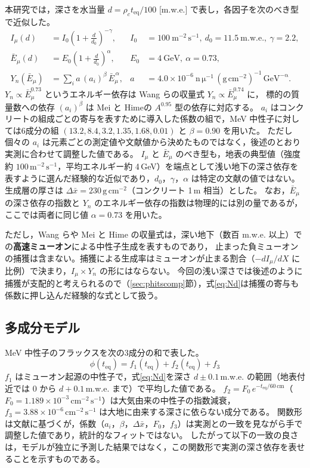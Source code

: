 \documentclass[a4paper,11pt]{ltjsarticle}
\newcommand{\teq}{t_{\mathrm{eq}}}
\newcommand{\flux}{\mathrm{cm^{-2}\,s^{-1}}}
\newcommand{\gcm}{\mathrm{g\,cm^{-2}}}
\begin{document}
本研究では，深さを水当量 $d=\rho_c\teq/100$ [m.w.e.] で表し，各因子を次のべき型で近似した。
\begin{align}
  I_\mu(d) &= I_0\left(1+\frac{d}{d_0}\right)^{-\gamma},
  & I_0 &= 100\ \mathrm{m^{-2}\,s^{-1}},\ d_0=11.5\ \mathrm{m.w.e.},\ \gamma=2.2, \\
  \bar{E}_\mu(d) &= E_0\left(1+\frac{d}{d_0}\right)^{\alpha},
  & E_0 &= 4\ \mathrm{GeV},\ \alpha=0.73, \\
  Y_n(\bar{E}_\mu) &= \sum_i a\,(a_i)^{\beta}\,\bar{E}_\mu^{\,\alpha},
  & a &= 4.0\times10^{-6}\ \mathrm{n\,\mu^{-1}\,(g\,cm^{-2})^{-1}\,GeV^{-\alpha}}.
\end{align}
$Y_n\propto\bar{E}_\mu^{0.73}$ というエネルギー依存は Wang ら\cite{Wang2001}の収量式 $Y_n\propto\bar{E}_\mu^{0.74}$ に，
標的の質量数への依存 $(a_i)^{\beta}$ は Mei と Hime\cite{MeiHime2006}の $A^{0.95}$ 型の依存に対応する。
$a_i$ はコンクリートの組成ごとの寄与を表すために導入した係数の組で，MeV 中性子に対しては6成分の組 $(13.2, 8.4, 3.2, 1.35, 1.68, 0.01)$ と $\beta=0.90$ を用いた。
ただし個々の $a_i$ は元素ごとの測定値や文献値から決めたものではなく，後述のとおり実測に合わせて調整した値である。
$I_\mu$ と $\bar{E}_\mu$ のべき型も，地表の典型値（強度約 $100\,\mathrm{m^{-2}\,s^{-1}}$，平均エネルギー約 4\,GeV）を端点として浅い地下の深さ依存を表すように選んだ経験的な近似であり，$d_0$，$\gamma$，$\alpha$ は特定の文献の値ではない。
生成層の厚さは $\Delta\bar{x}=230\,\gcm$（コンクリート 1\,m 相当）とした。
なお，$\bar{E}_\mu$ の深さ依存の指数と $Y_n$ のエネルギー依存の指数は物理的には別の量であるが，ここでは両者に同じ値 $\alpha=0.73$ を用いた。

ただし，Wang らや Mei と Hime の収量式は，深い地下（数百 m.w.e. 以上）での\textbf{高速ミューオン}による中性子生成を表すものであり，
止まった負ミューオンの捕獲は含まない。捕獲による生成率はミューオンが止まる割合（$-dI_\mu/dX$ に比例）で決まり，$I_\mu\times Y_n$ の形にはならない。
今回の浅い深さでは後述のように捕獲が支配的と考えられるので（\ref{sec:phitscomp}節），式\eqref{eq:Nd}は捕獲の寄与も係数に押し込んだ経験的な式として扱う。

\subsection{多成分モデル}
\label{sec:model}

MeV 中性子のフラックスを次の3成分の和で表した。
\begin{equation}
  \phi(\teq) = f_1(\teq) + f_2(\teq) + f_3
  \label{eq:model}
\end{equation}
$f_1$ はミューオン起源の中性子で，式\eqref{eq:Nd}を深さ $d\pm0.1$\,m.w.e. の範囲（地表付近では $0$ から $d+0.1$\,m.w.e. まで）で平均した値である。
$f_2 = F_0\,e^{-\teq/60\,\mathrm{cm}}$（$F_0=1.189\times10^{-3}\,\flux$）は大気由来の中性子の指数減衰，
$f_3=3.88\times10^{-6}\,\flux$ は大地に由来する深さに依らない成分である。
関数形は文献に基づくが，係数（$a_i$，$\beta$，$\Delta\bar{x}$，$F_0$，$f_3$）は実測との一致を見ながら手で調整した値であり，統計的なフィットではない。
したがって以下の一致の良さは，モデルが独立に予測した結果ではなく，この関数形で実測の深さ依存を表せることを示すものである。
\end{document}
